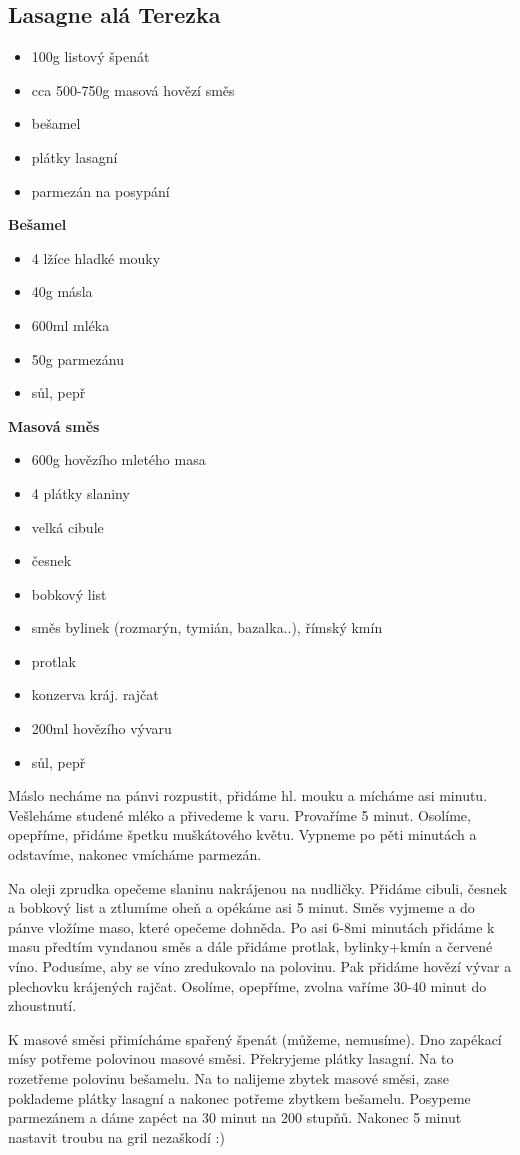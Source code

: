 \documentclass[10pt,a4paper]{article}
\newenvironment{myitemize}
{ \begin{itemize}
    \setlength{\itemsep}{0pt}
    \setlength{\parskip}{0pt}
    \setlength{\parsep}{0pt}     }
{ \end{itemize}                  }
\begin{document}
\subsection{Lasagne alá Terezka}
\begin{minipage}[t]{0,5\textwidth}
\begin{myitemize} 
\item 100g listový špenát
\item cca 500-750g masová hovězí směs
\item bešamel
\item plátky lasagní
\item parmezán na posypání
\end{myitemize}
\textbf{Bešamel}
\begin{myitemize} 
\item 4 lžíce hladké mouky
\item 40g másla
\item 600ml mléka
\item 50g parmezánu
\item sůl, pepř
\end{myitemize}
\textbf{Masová směs}
\begin{myitemize} 
\item 600g hovězího mletého masa
\item 4 plátky slaniny
\item velká cibule
\item česnek 
\item bobkový list
\item směs bylinek (rozmarýn, tymián, bazalka..), římský kmín
\item protlak
\item konzerva kráj. rajčat
\item 200ml hovězího vývaru
\item sůl, pepř
\end{myitemize}
\end{minipage}
\begin{minipage}[t]{0,5\textwidth}
Máslo necháme na pánvi rozpustit, přidáme hl. mouku a mícháme asi minutu. Vešleháme studené mléko a přivedeme k varu. Provaříme 5 minut. Osolíme, opepříme, přidáme špetku muškátového květu. Vypneme po pěti minutách a odstavíme, nakonec vmícháme parmezán.

Na oleji zprudka opečeme slaninu nakrájenou na nudličky. Přidáme cibuli, česnek a bobkový list a ztlumíme oheň a opékáme asi 5 minut. Směs vyjmeme a do pánve vložíme maso, které opečeme dohněda. Po asi 6-8mi minutách přidáme k masu předtím vyndanou směs a dále přidáme protlak, bylinky+kmín a červené víno. Podusíme, aby se víno zredukovalo na polovinu. Pak přidáme hovězí vývar a plechovku krájených rajčat. Osolíme, opepříme, zvolna vaříme 30-40 minut do zhoustnutí.

K masové směsi přimícháme spařený špenát (můžeme, nemusíme). Dno zapékací mísy potřeme polovinou masové směsi. Překryjeme plátky lasagní. Na to rozetřeme polovinu bešamelu. Na to nalijeme zbytek masové směsi, zase poklademe plátky lasagní a nakonec potřeme zbytkem bešamelu. Posypeme parmezánem a dáme zapéct na 30 minut na 200 stupňů. Nakonec 5 minut nastavit troubu na gril nezaškodí :)
\end{minipage}
\pagebreak
\end{document}
